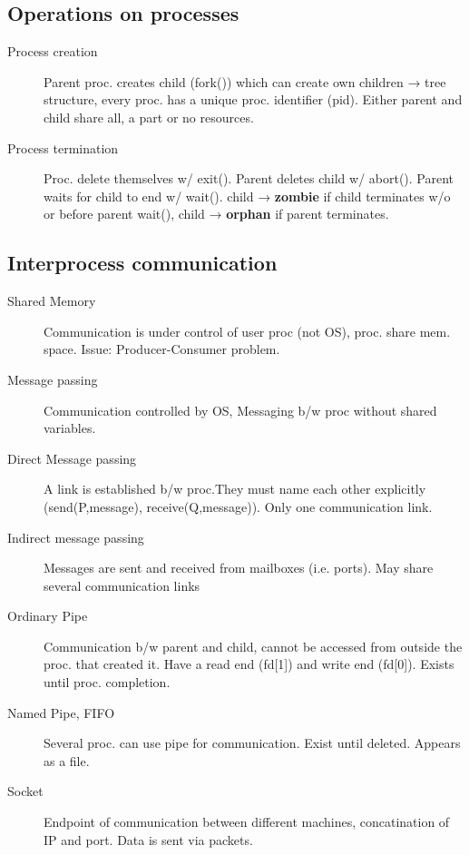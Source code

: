 \subsection*{Operations on processes}
\begin{description}
  \item[Process creation]Parent proc. creates child (fork()) which can create own children → tree structure, every proc. has a unique proc. identifier (pid). Either parent and child share all, a part or no resources.
  \item[Process termination] Proc. delete themselves w/ exit(). Parent deletes child w/ abort(). Parent waits for child to end w/ wait(). child → \textbf{zombie} if child terminates w/o or before parent wait(), child → \textbf{orphan} if parent terminates.
\end{description}

\subsection*{Interprocess communication}
\begin{description}
  \item[Shared Memory]Communication is under control of user proc (not OS), proc. share mem. space. Issue: Producer-Consumer problem. 
  \item[Message passing] Communication controlled by OS, Messaging b/w proc without shared variables.
  \item[Direct Message passing] A link is established b/w proc.They must name each other explicitly (send(P,message), receive(Q,message)). Only one communication link.
  \item[Indirect message passing] Messages are sent and received from mailboxes (i.e. ports). May share several communication links
  \item[Ordinary Pipe] Communication b/w parent and child, cannot be accessed from outside the proc. that created it. Have a read end (fd[1]) and write end (fd[0]). Exists until proc. completion.
  \item[Named Pipe, FIFO] Several proc. can use pipe for communication. Exist until deleted. Appears as a file.
  \item[Socket] Endpoint of communication between different machines, concatination of IP and port. Data is sent via packets.
\end{description}
